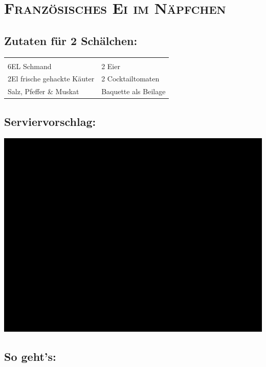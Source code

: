 \section{\textsc{Französisches Ei im Näpfchen}}

\subsection*{Zutaten für 2 Schälchen:}

\begin{tabular}{p{7.5cm} p{7.5cm}}
	& \\
	6EL Schmand & 2 Eier \\
	2El frische gehackte Käuter & 2 Cocktailtomaten \\
  Salz, Pfeffer \& Muskat & Baquette als Beilage
\end{tabular}

\subsection*{Serviervorschlag:}

\includegraphics[width=\textwidth]{img/ph.jpg}

\subsection*{So geht's:}

